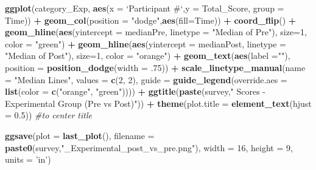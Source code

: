 \documentclass[
]{article}
\newenvironment{Shaded}{\begin{snugshade}}{\end{snugshade}}
\newcommand{\CommentTok}[1]{\textcolor[rgb]{0.56,0.35,0.01}{\textit{#1}}}
\newcommand{\DataTypeTok}[1]{\textcolor[rgb]{0.13,0.29,0.53}{#1}}
\newcommand{\DecValTok}[1]{\textcolor[rgb]{0.00,0.00,0.81}{#1}}
\newcommand{\FloatTok}[1]{\textcolor[rgb]{0.00,0.00,0.81}{#1}}
\newcommand{\KeywordTok}[1]{\textcolor[rgb]{0.13,0.29,0.53}{\textbf{#1}}}
\newcommand{\NormalTok}[1]{#1}
\newcommand{\OperatorTok}[1]{\textcolor[rgb]{0.81,0.36,0.00}{\textbf{#1}}}
\newcommand{\StringTok}[1]{\textcolor[rgb]{0.31,0.60,0.02}{#1}}
\begin{document}
\begin{Shaded}
\begin{Highlighting}[]
{{{{{{{{{{  \KeywordTok{ggplot}\NormalTok{(category_Exp, }\KeywordTok{aes}\NormalTok{(}\DataTypeTok{x =} \StringTok{`}\DataTypeTok{Participant #}\StringTok{`}\NormalTok{,}\DataTypeTok{y =}\NormalTok{ Total_Score, }\DataTypeTok{group =}\NormalTok{ Time)) }\OperatorTok{+}\StringTok{ }
\StringTok{    }\KeywordTok{geom_col}\NormalTok{(}\DataTypeTok{position =} \StringTok{"dodge"}\NormalTok{,}\KeywordTok{aes}\NormalTok{(}\DataTypeTok{fill=}\NormalTok{Time)) }\OperatorTok{+}
\StringTok{    }\KeywordTok{coord_flip}\NormalTok{() }\OperatorTok{+}
\StringTok{    }\KeywordTok{geom_hline}\NormalTok{(}\KeywordTok{aes}\NormalTok{(}\DataTypeTok{yintercept =}\NormalTok{ medianPre, }\DataTypeTok{linetype =} \StringTok{"Median of Pre"}\NormalTok{), }\DataTypeTok{size=}\DecValTok{1}\NormalTok{, }\DataTypeTok{color =} \StringTok{"green"}\NormalTok{) }\OperatorTok{+}
\StringTok{    }\KeywordTok{geom_hline}\NormalTok{(}\KeywordTok{aes}\NormalTok{(}\DataTypeTok{yintercept =}\NormalTok{ medianPost, }\DataTypeTok{linetype =} \StringTok{"Median of Post"}\NormalTok{), }\DataTypeTok{size=}\DecValTok{1}\NormalTok{, }\DataTypeTok{color =} \StringTok{"orange"}\NormalTok{) }\OperatorTok{+}
\StringTok{    }\KeywordTok{geom_text}\NormalTok{(}\KeywordTok{aes}\NormalTok{(}\DataTypeTok{label =}\StringTok{""}\NormalTok{), }\DataTypeTok{position =} \KeywordTok{position_dodge}\NormalTok{(}\DataTypeTok{width =} \FloatTok{.75}\NormalTok{)) }\OperatorTok{+}
\StringTok{    }\KeywordTok{scale_linetype_manual}\NormalTok{(}\DataTypeTok{name =} \StringTok{"Median Lines"}\NormalTok{, }\DataTypeTok{values =} \KeywordTok{c}\NormalTok{(}\DecValTok{2}\NormalTok{, }\DecValTok{2}\NormalTok{), }
                      \DataTypeTok{guide =} \KeywordTok{guide_legend}\NormalTok{(}\DataTypeTok{override.aes =} \KeywordTok{list}\NormalTok{(}\DataTypeTok{color =} \KeywordTok{c}\NormalTok{(}\StringTok{"orange"}\NormalTok{, }\StringTok{"green"}\NormalTok{)))) }\OperatorTok{+}
\StringTok{    }\KeywordTok{ggtitle}\NormalTok{(}\KeywordTok{paste}\NormalTok{(survey,}\StringTok{" Scores - Experimental Group (Pre vs Post)"}\NormalTok{)) }\OperatorTok{+}
\StringTok{    }\KeywordTok{theme}\NormalTok{(}\DataTypeTok{plot.title =} \KeywordTok{element_text}\NormalTok{(}\DataTypeTok{hjust =} \FloatTok{0.5}\NormalTok{)) }\CommentTok{#to center title }

  \KeywordTok{ggsave}\NormalTok{(}\DataTypeTok{plot =} \KeywordTok{last_plot}\NormalTok{(), }\DataTypeTok{filename =} \KeywordTok{paste0}\NormalTok{(survey,}\StringTok{"_Experimental_post_vs_pre.png"}\NormalTok{), }\DataTypeTok{width =} \DecValTok{16}\NormalTok{, }\DataTypeTok{height =} \DecValTok{9}\NormalTok{, }\DataTypeTok{units =} \StringTok{'in'}\NormalTok{)}
  
}}}}}}}}}}
\end{Highlighting}
\end{Shaded}
\end{document}
